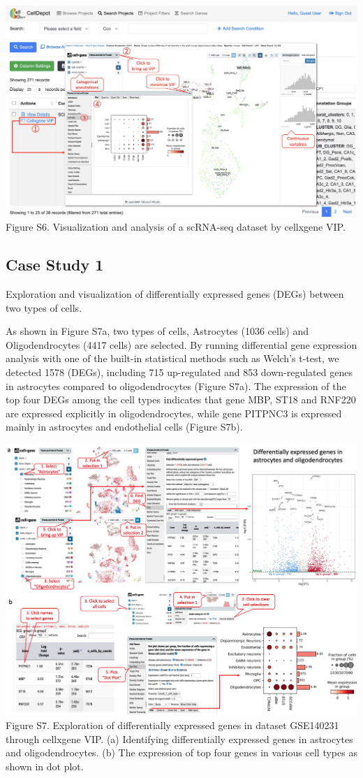 \documentclass[
  openany]{book}
\begin{document}
\href{figures/S6.jpg}{\includegraphics{figures/S6.jpg}}
Figure S6. Visualization and analysis of a scRNA-seq dataset by cellxgene VIP.

\hypertarget{case-study-1}{%
\subsection{Case Study 1}\label{case-study-1}}

Exploration and visualization of differentially expressed genes (DEGs) between two types of cells.

As shown in Figure S7a, two types of cells, Astrocytes (1036 cells) and Oligodendrocytes (4417 cells) are selected. By running differential gene expression analysis with one of the built-in statistical methods such as Welch's t-test, we detected 1578 (DEGs), including 715 up-regulated and 853 down-regulated genes in astrocytes compared to oligodendrocytes (Figure S7a). The expression of the top four DEGs among the cell types indicates that gene MBP, ST18 and RNF220 are expressed explicitly in oligodendrocytes, while gene PITPNC3 is expressed mainly in astrocytes and endothelial cells (Figure S7b).

\href{figures/S7.jpg}{\includegraphics{figures/S7.jpg}}
Figure S7. Exploration of differentially expressed genes in dataset GSE140231 through cellxgene VIP. (a) Identifying differentially expressed genes in astrocytes and oligodendrocytes. (b) The expression of top four genes in various cell types as shown in dot plot.
\end{document}
